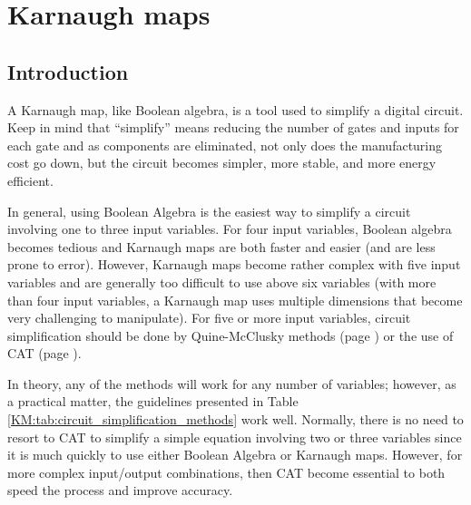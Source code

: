 \chapter{Karnaugh maps}\label{ch06}

\section{Introduction}


A Karnaugh map, like Boolean algebra, is a tool used to simplify a digital circuit. Keep in mind that ``simplify'' means reducing the number of gates and inputs for each gate and as components are eliminated, not only does the manufacturing cost go down, but the circuit becomes simpler, more stable, and more energy efficient. 

In general, using Boolean Algebra is the easiest way to simplify a circuit involving one to three input variables. For four input variables, Boolean algebra becomes tedious and Karnaugh maps are both faster and easier (and are less prone to error). However, Karnaugh maps become rather complex with five input variables and are generally too difficult to use above six variables (with more than four input variables, a Karnaugh map uses multiple dimensions that become very challenging to manipulate). For five or more input variables, circuit simplification should be done by Quine-McClusky methods  (page \pageref{ASM:sec:quine-mccluskey_simplification_method}) or the use of \ac{CAT} (page \pageref{ASM:sec:automated_tools}).

In theory, any of the methods will work for any number of variables; however, as a practical matter, the guidelines presented in Table \ref{KM:tab:circuit_simplification_methods} work well. Normally, there is no need to resort to \ac{CAT} to simplify a simple equation involving two or three variables since it is much quickly to use either Boolean Algebra or Karnaugh maps. However, for more complex input/output combinations, then \ac{CAT} become essential to both speed the process and improve accuracy. 

